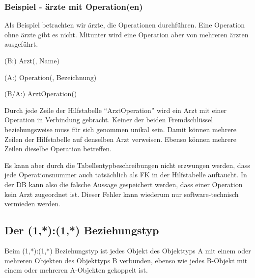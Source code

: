         \subsubsection{Beispiel - ärzte mit Operation(en)}
          Als Beispiel betrachten wir ärzte, die Operationen durchführen. Eine Operation ohne ärzte gibt es nicht. Mitunter wird eine Operation aber von mehreren ärzten ausgeführt.
          \begin{center}
          \end{center}
          \begin{small}
            (B:) Arzt(, Name)

            (A:) Operation(, Bezeichnung)

            (B/A:) ArztOperation()
          \end{small}
          Durch jede Zeile der Hilfstabelle \enquote{ArztOperation} wird ein Arzt mit einer Operation in Verbindung gebracht. Keiner der beiden Fremdschlüssel  beziehungsweise  muss für sich genommen unikal sein. Damit können mehrere Zeilen der Hilfstabelle auf denselben Arzt verweisen. Ebenso können mehrere Zeilen dieselbe Operation betreffen.

          Es kann aber durch die Tabellentypbeschreibungen nicht erzwungen werden, dass jede Operationsnummer auch tatsächlich als FK in der Hilfstabelle auftaucht. In der DB kann also die falsche Aussage gespeichert werden, dass einer Operation kein Arzt zugeordnet ist. Dieser Fehler kann wiederum nur software-technisch vermieden werden.
      \subsection{Der (1,*):(1,*) Beziehungstyp}
        Beim (1,*):(1,*) Beziehungstyp ist jedes Objekt des Objekttyps A mit einem oder mehreren Objekten des Objekttyps B verbunden, ebenso wie jedes B-Objekt mit einem oder mehreren A-Objekten gekoppelt ist.


